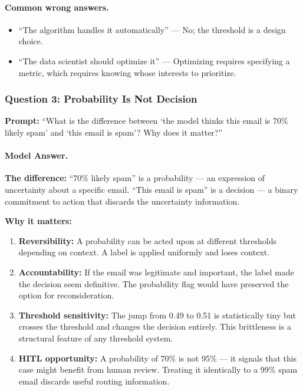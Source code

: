 \paragraph{Common wrong answers.}
\begin{itemize}
    \item ``The algorithm handles it automatically'' --- No; the threshold is a design choice.
    \item ``The data scientist should optimize it'' --- Optimizing requires specifying a metric, which requires knowing whose interests to prioritize.
\end{itemize}

\subsubsection{Question 3: Probability Is Not Decision}

\textbf{Prompt:} ``What is the difference between `the model thinks this email is 70\% likely spam' and `this email is spam'? Why does it matter?''

\paragraph{Model Answer.}

\textbf{The difference:}
``70\% likely spam'' is a probability --- an expression of uncertainty about a specific email. ``This email is spam'' is a decision --- a binary commitment to action that discards the uncertainty information.

\textbf{Why it matters:}

\begin{enumerate}
    \item \textbf{Reversibility:} A probability can be acted upon at different thresholds depending on context. A label is applied uniformly and loses context.

    \item \textbf{Accountability:} If the email was legitimate and important, the label made the decision seem definitive. The probability flag would have preserved the option for reconsideration.

    \item \textbf{Threshold sensitivity:} The jump from 0.49 to 0.51 is statistically tiny but crosses the threshold and changes the decision entirely. This brittleness is a structural feature of any threshold system.

    \item \textbf{HITL opportunity:} A probability of 70\% is not 95\% --- it signals that this case might benefit from human review. Treating it identically to a 99\% spam email discards useful routing information.
\end{enumerate}

